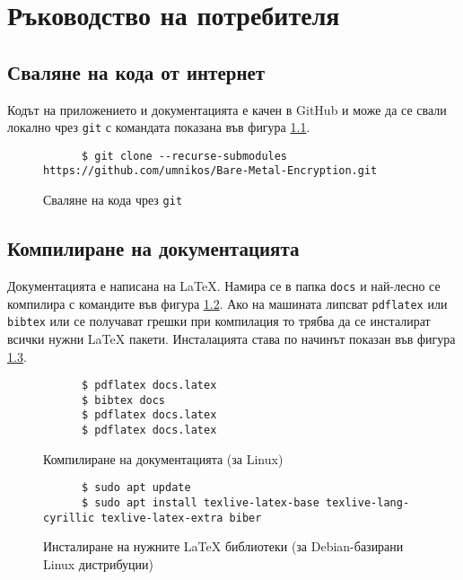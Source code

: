 \chapter{Ръководство на потребителя}
  \section{Сваляне на кода от интернет}
  Кодът на приложението и документацията е качен в GitHub и може да се свали локално чрез {\tt git} с командата показана във фигура \ref{fig:repo-download}.
  \begin{figure}[ht]
    \centering
    \begin{verbatim}
      $ git clone --recurse-submodules https://github.com/umnikos/Bare-Metal-Encryption.git
    \end{verbatim}
    \caption{Сваляне на кода чрез {\tt git}}
    \label{fig:repo-download}
  \end{figure}

  \section{Компилиране на документацията}
  Документацията е написана на \LaTeX{}. Намира се в папка {\tt docs} и най-лесно се компилира с командите във фигура \ref{fig:latex-compiling}. Ако на машината липсват {\tt pdflatex} или {\tt bibtex} или се получават грешки при компилация то трябва да се инсталират всички нужни \LaTeX{} пакети. Инсталацията става по начинът показан във фигура \ref{fig:latex-requirements}.
  \begin{figure}[ht]
    \centering
    \begin{verbatim}
      $ pdflatex docs.latex
      $ bibtex docs
      $ pdflatex docs.latex
      $ pdflatex docs.latex
    \end{verbatim}
    \caption{Компилиране на документацията (за Linux)}
    \label{fig:latex-compiling}
  \end{figure}
  \begin{figure}[ht]
    \centering
    \begin{verbatim}
      $ sudo apt update
      $ sudo apt install texlive-latex-base texlive-lang-cyrillic texlive-latex-extra biber
    \end{verbatim}
    \caption{Инсталиране на нужните \LaTeX{} библиотеки (за Debian-базирани Linux дистрибуции)}
    \label{fig:latex-requirements}
  \end{figure}

